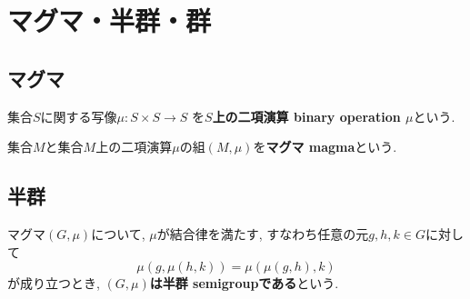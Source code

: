 \section{マグマ・半群・群}
\subsection{マグマ}
\begin{Def}
集合$S$に関する写像$\mu:S\times S\rightarrow S$
を{\bf $S$上の二項演算 binary operation $\mu$}という.
\end{Def}
\begin{Def}
集合$M$と集合$M$上の二項演算$\mu$の組$(M,\mu)$を{\bf マグマ magma}という.
\end{Def}
\subsection{半群}
\begin{Def}
マグマ$(G,\mu)$について,
$\mu$が結合律を満たす, すなわち任意の元$g,h,k\in G$に対して\[\mu(g,\mu(h,k))=\mu(\mu(g,h),k)\]
が成り立つとき, {\bf $(G,\mu)$は半群 semigroupである}という.
\end{Def}
